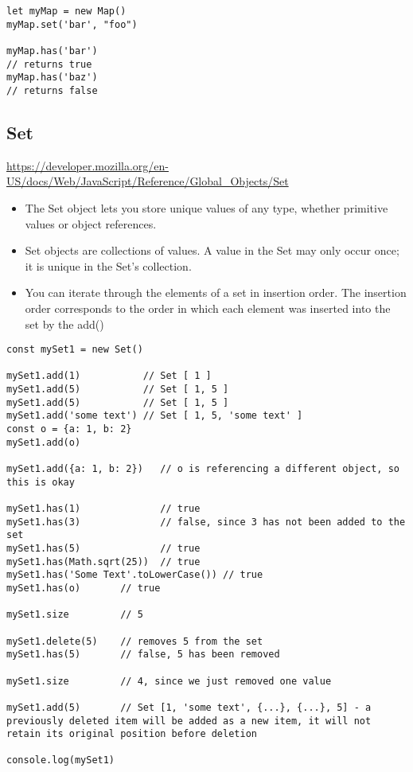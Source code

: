 \documentclass[10pt]{article}
\begin{document}
\begin{lstlisting}[title=Example has(), captionpos=t]
let myMap = new Map()
myMap.set('bar', "foo")

myMap.has('bar')   
// returns true
myMap.has('baz')   
// returns false
\end{lstlisting}
\medskip %







\medskip %
\pagebreak
\subsection{Set}

\url{https://developer.mozilla.org/en-US/docs/Web/JavaScript/Reference/Global_Objects/Set}

\begin{itemize}
	\item The Set object lets you store unique values of any type, whether primitive values or object references.	
	\item Set objects are collections of values. A value in the Set may only occur once; it is unique in the Set's collection.
	\item You can iterate through the elements of a set in insertion order. The insertion order corresponds to the order in which each element was inserted into the set by the add()

\end{itemize}

\begin{lstlisting}[title=Example Set 0bject, captionpos=t]
const mySet1 = new Set()

mySet1.add(1)           // Set [ 1 ]
mySet1.add(5)           // Set [ 1, 5 ]
mySet1.add(5)           // Set [ 1, 5 ]
mySet1.add('some text') // Set [ 1, 5, 'some text' ]
const o = {a: 1, b: 2}
mySet1.add(o)

mySet1.add({a: 1, b: 2})   // o is referencing a different object, so this is okay

mySet1.has(1)              // true
mySet1.has(3)              // false, since 3 has not been added to the set
mySet1.has(5)              // true
mySet1.has(Math.sqrt(25))  // true
mySet1.has('Some Text'.toLowerCase()) // true
mySet1.has(o)       // true

mySet1.size         // 5

mySet1.delete(5)    // removes 5 from the set
mySet1.has(5)       // false, 5 has been removed

mySet1.size         // 4, since we just removed one value

mySet1.add(5)       // Set [1, 'some text', {...}, {...}, 5] - a previously deleted item will be added as a new item, it will not retain its original position before deletion

console.log(mySet1)


\end{lstlisting}
\end{document}
